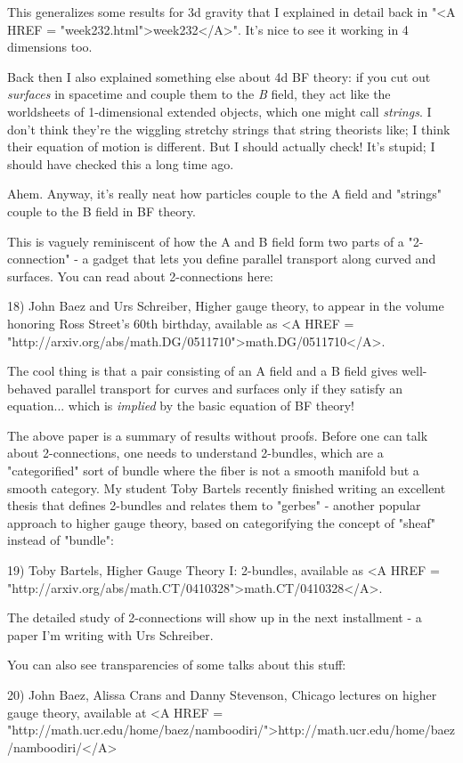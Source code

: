 This generalizes some results for 3d gravity that I explained in
detail back in "<A HREF = "week232.html">week232</A>".  It's
nice to see it working in 4 dimensions too.

Back then I also explained something else about 4d BF theory: if you
cut out \emph{surfaces} in spacetime and couple them to the
\emph{B} field, they act like the worldsheets of 1-dimensional
extended objects, which one might call \emph{strings}.  I don't
think they're the wiggling stretchy strings that string theorists
like; I think their equation of motion is different.  But I should
actually check!  It's stupid; I should have checked this a long time
ago.

Ahem.  Anyway, it's really neat how particles couple to the 
A field and "strings" couple to the B field in BF theory.  

This is vaguely reminiscent of how the A and B field form two 
parts of a "2-connection" - a gadget that lets you define 
parallel transport along curved and surfaces.  You can read 
about 2-connections here:

18) John Baez and Urs Schreiber, Higher gauge theory, to appear in the
volume honoring Ross Street's 60th birthday, available as <A HREF =
"http://arxiv.org/abs/math.DG/0511710">math.DG/0511710</A>.

The cool thing is that a pair consisting of an A field and a
B field gives well-behaved parallel transport for curves and
surfaces only if they satisfy an equation... which is \emph{implied}
by the basic equation of BF theory!  

The above paper is a summary of results without proofs.  Before one
can talk about 2-connections, one needs to understand 2-bundles, which
are a "categorified" sort of bundle where the fiber is not a
smooth manifold but a smooth category.  My student Toby Bartels
recently finished writing an excellent thesis that defines 2-bundles
and relates them to "gerbes" - another popular approach to
higher gauge theory, based on categorifying the concept of
"sheaf" instead of "bundle":

19) Toby Bartels, Higher Gauge Theory I: 2-bundles, available 
as <A HREF = "http://arxiv.org/abs/math.CT/0410328">math.CT/0410328</A>.

The detailed study of 2-connections will show up in the next
installment - a paper I'm writing with Urs Schreiber.  

You can also see transparencies of some talks about this 
stuff:

20) John Baez, Alissa Crans and Danny Stevenson, Chicago
lectures on higher gauge theory, available at 
<A HREF = "http://math.ucr.edu/home/baez/namboodiri/">http://math.ucr.edu/home/baez/namboodiri/</A>

